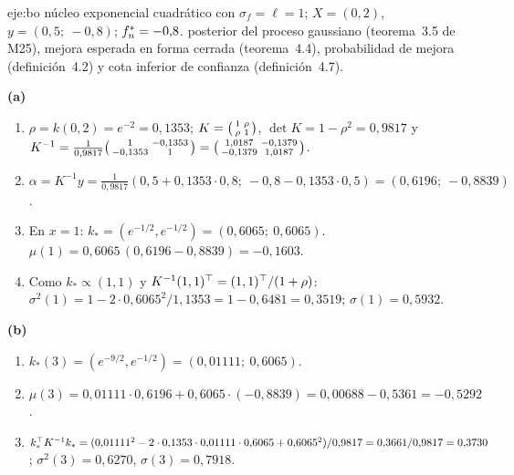 \begin{solucion}{eje:bo}
\datos núcleo exponencial cuadrático con $\sigma_f=\ell=1$; $X=(0,2)$, $y=(0{,}5;\ -0{,}8)$; $f^{\ast}_{n}=-0{,}8$.
\planteamiento posterior del proceso gaussiano (teorema~3.5 de M25), mejora esperada en forma cerrada (teorema~4.4), probabilidad de mejora (definición~4.2) y cota inferior de confianza (definición~4.7).
\pasos

\noindent\textbf{(a)}
\begin{enumerate}[label=\arabic*.]
  \item $\rho=k(0,2)=e^{-2}=0{,}1353$; $K=\begin{psmallmatrix}1&\rho\\\rho&1\end{psmallmatrix}$, $\det K=1-\rho^{2}=0{,}9817$ y $K^{-1}=\frac{1}{0{,}9817}\begin{psmallmatrix}1&-0{,}1353\\-0{,}1353&1\end{psmallmatrix}=\begin{psmallmatrix}1{,}0187&-0{,}1379\\-0{,}1379&1{,}0187\end{psmallmatrix}$.
  \item $\alpha=K^{-1}y=\frac{1}{0{,}9817}(0{,}5+0{,}1353\cdot 0{,}8;\ -0{,}8-0{,}1353\cdot 0{,}5)=(0{,}6196;\ -0{,}8839)$.
  \item En $x=1$: $k_\ast=(e^{-1/2},e^{-1/2})=(0{,}6065;\ 0{,}6065)$. $\mu(1)=0{,}6065\,(0{,}6196-0{,}8839)=-0{,}1603$.
  \item Como $k_\ast\propto(1,1)$ y $K^{-1}(1,1)^{\top}=(1,1)^{\top}/(1+\rho)$: $\sigma^{2}(1)=1-2\cdot 0{,}6065^{2}/1{,}1353=1-0{,}6481=0{,}3519$; $\sigma(1)=0{,}5932$.
\end{enumerate}

\noindent\textbf{(b)}
\begin{enumerate}[label=\arabic*.]
  \item $k_\ast(3)=(e^{-9/2},e^{-1/2})=(0{,}01111;\ 0{,}6065)$.
  \item $\mu(3)=0{,}01111\cdot 0{,}6196+0{,}6065\cdot(-0{,}8839)=0{,}00688-0{,}5361=-0{,}5292$.
  \item $k_\ast^{\top} K^{-1}k_\ast=(0{,}01111^{2}-2\cdot 0{,}1353\cdot 0{,}01111\cdot 0{,}6065+0{,}6065^{2})/0{,}9817=0{,}3661/0{,}9817=0{,}3730$; $\sigma^{2}(3)=0{,}6270$, $\sigma(3)=0{,}7918$.
\end{enumerate}


\end{solucion}
